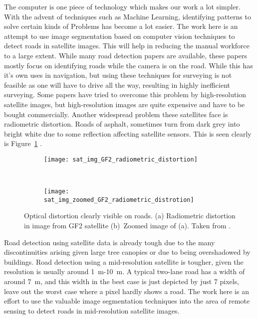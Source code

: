 The computer is one piece of technology which makes our work a lot simpler. With the advent of techniques such as Machine Learning, identifying patterns to solve certain kinds of Problems has become a lot easier. The work here is an attempt to use image segmentation based on computer vision techniques to detect roads in satellite images. This will help in reducing the manual workforce to a large extent. While many road detection papers are available, these papers mostly focus on identifying roads while the camera is on the road. While this has it's own uses in navigation, but using these techniques for surveying is not feasible as one will have to drive all the way, resulting in highly inefficient surveying. Some papers have tried to overcome this problem by high-resolution satellite images, but high-resolution images are quite expensive and have to be bought commercially. Another widespread problem these satellites face is radiometric distortion. Roads of asphalt, sometimes turn from dark grey into bright white due to some reflection affecting satellite sensors. This is seen clearly is Figure~\ref{fig:sat_img_radiometric_distortion} \cite{GF2-imageCaseStudy}.

\begin{figure}[h!]
  \centering
  \begin{subfigure}{0.48\textwidth}
    \texttt{[image: sat\_img\_GF2\_radiometric\_distortion]}
    \caption{}
  \end{subfigure}~
  \begin{subfigure}{0.48\textwidth}
    \texttt{[image: sat\_img\_zoomed\_GF2\_radiometric\_distrotion]}
    \caption{}
  \end{subfigure}
  \caption[Optical distortion clearly visible on roads]{Optical distortion clearly visible on roads. (a) Radiometric distortion in image from GF2 satellite (b)~Zoomed image of (a). Taken from \cite{GF2-imageCaseStudy}.}%
  \label{fig:sat_img_radiometric_distortion}%
\end{figure}

Road detection using satellite data is already tough due to the many discontinuities arising given large tree canopies or due to being overshadowed by buildings. Road detection using a mid-resolution satellite is tougher, given the resolution is usually around 1~m-10~m. A typical two-lane road has a width of around 7~m, and this width in the best case is just depicted by just 7 pixels, leave out the worst case where a pixel hardly shows a road. The work here is an effort to use the valuable image segmentation techniques into the area of remote sensing to detect roads in mid-resolution satellite images.